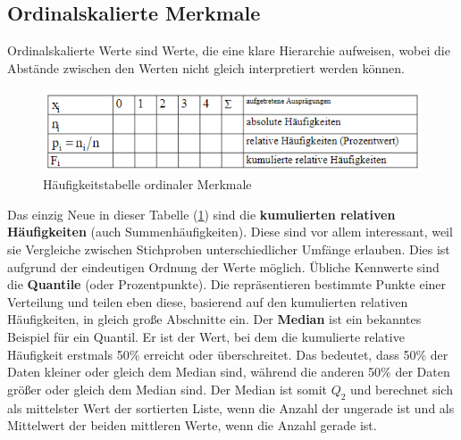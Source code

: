 \subsection{Ordinalskalierte Merkmale}
Ordinalskalierte Werte sind Werte, die eine klare Hierarchie aufweisen, wobei die Abstände zwischen den Werten nicht gleich interpretiert werden können.
\begin{figure}[h]
    \centering
    \includegraphics[width=\textwidth]{haeufigkeitstabelle-ordinale-merkmale}
    \caption{Häufigkeitstabelle ordinaler Merkmale}
    \label{fig:haeufigkeitstabelle-ordinale-merkmale}
\end{figure}
\newline
Das einzig Neue in dieser Tabelle (\ref{fig:haeufigkeitstabelle-ordinale-merkmale}) sind die \textbf{kumulierten relativen Häufigkeiten} (auch Summenhäufigkeiten).
Diese sind vor allem interessant, weil sie Vergleiche zwischen Stichproben unterschiedlicher Umfänge erlauben.
Dies ist aufgrund der eindeutigen Ordnung der Werte möglich.
\newline
Übliche Kennwerte sind die \textbf{Quantile} (oder Prozentpunkte).
Die repräsentieren bestimmte Punkte einer Verteilung und teilen eben diese, basierend auf den kumulierten relativen Häufigkeiten, in gleich große Abschnitte ein. \newline
{}
Der \textbf{Median} ist ein bekanntes Beispiel für ein Quantil.
Er ist der Wert, bei dem die kumulierte relative Häufigkeit erstmals 50\% erreicht oder überschreitet.
Das bedeutet, dass 50\% der Daten kleiner oder gleich dem Median sind, während die anderen 50\% der Daten größer oder gleich dem Median sind.
Der Median ist somit $Q_2$ und berechnet sich als mittelster Wert der sortierten Liste, wenn die Anzahl der ungerade ist und als Mittelwert der beiden mittleren Werte, wenn die Anzahl gerade ist.



